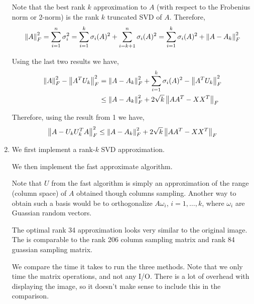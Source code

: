 \documentclass[10pt]{article}
\begin{document}
\begin{solution}[Solution]
\begin{enumerate}[label=(\alph*)]
        Note that the best rank \( k \) approximation to \( A \) (with respect to the Frobenius norm or 2-norm) is the rank \( k \) truncated SVD of \( A \). Therefore,
        \begin{align*}
            \left\lVert A\right\rVert_F^2 = \sum_{i=1}^{n}\sigma_i^2 = \sum_{i=1}^{k}\sigma_i(A)^2 + \sum_{i=k+1}^{n} \sigma_i(A)^2 = \sum_{i=1}^{k}\sigma_i(A)^2 + \left\lVert A-A_k\right\rVert_F^2 
        \end{align*}
        
        Using the last two results we have,
        \begin{align*}
            \left\lVert A\right\rVert_F^2 - \left\lVert A^T U_k\right\rVert_F^2
            &= \left\lVert A-A_k\right\rVert_F^2 + \sum_{i=1}^{k}\sigma_i(A)^2 - \left\lVert A^T U_k\right\rVert_F^2
            \\&\leq \left\lVert A-A_k\right\rVert_F^2 + 2\sqrt{k} \left\lVert AA^T-XX^T\right\rVert_F 
        \end{align*}
        
        Therefore, using the result from 1 we have,
        \begin{align*}
            \left\lVert A-U_kU_k^TA\right\rVert_F^2  
            \leq \left\lVert A-A_k\right\rVert_F^2 + 2\sqrt{k} \left\lVert AA^T-XX^T\right\rVert_F 
        \end{align*}
 

    \item

        We first implement a rank-\( k \) SVD approximation.
        

        We then implement the fast approximate algorithm.
        

        Note that \( U \) from the fast algorithm is simply an approximation of the range (column space) of \( A \) obtained though columns sampling. Another way to obtain such a basis would be to orthogonalize \( A \omega_i \), \( i=1,\ldots,k \), where \( \omega_i \) are Guassian random vectors. 
        

        
        The optimal rank 34 approximation looks very similar to the original image. The is comparable to the rank 206 column sampling matrix and rank 84 guassian sampling matrix.




        We compare the time it takes to run the three methods. Note that we only time the matrix operations, and not any I/O. There is a lot of overhead with displaying the image, so it doesn't make sense to include this in the comparison. 
 

\end{enumerate}
\end{solution}
\end{document}
